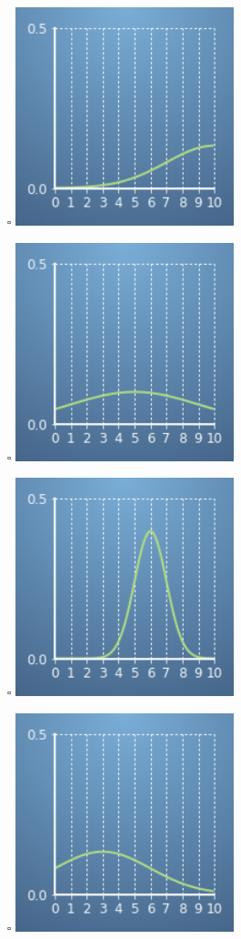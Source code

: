 \documentclass[]{article}
\begin{document}
\begin{itemize}
	\item[$\square$] \includegraphics[width=0.5\textwidth]{quiz3_a}
	\item[$\square$] \includegraphics[width=0.5\textwidth]{quiz3_b}
	\item[$\square$] \includegraphics[width=0.5\textwidth]{quiz3_c}
	\item[$\square$] \includegraphics[width=0.5\textwidth]{quiz3_d}
\end{itemize}
\end{document}

